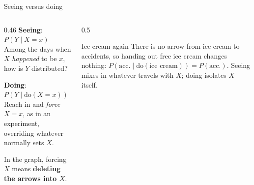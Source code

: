 \documentclass[aspectratio=169,11pt,xcolor={table}]{beamer}
\begin{document}
\begin{frame}{Seeing versus doing}
  \begin{columns}[T]
    \begin{column}{0.46\textwidth}
      \textbf{Seeing}: $P(Y \mid X = x)$\\
      Among the days when $X$ \emph{happened} to be $x$, how is $Y$ distributed?
      \medskip

      \textbf{Doing}: $P(Y \mid \mathrm{do}(X = x))$\\
      Reach in and \emph{force} $X = x$, as in an experiment, overriding whatever normally sets $X$.
      \medskip

      In the graph, forcing $X$ means \textbf{deleting the arrows into $X$}.
    \end{column}
    \begin{column}{0.5\textwidth}
      \centering
      \par\medskip
      \begin{block}{Ice cream again}
        \small There is no arrow from ice cream to accidents, so handing out free ice cream changes nothing:
        $P(\text{acc.} \mid \mathrm{do}(\text{ice cream})) = P(\text{acc.})$.
        Seeing mixes in whatever travels with $X$; doing isolates $X$ itself.
      \end{block}
    \end{column}
  \end{columns}
\end{frame}
\end{document}
